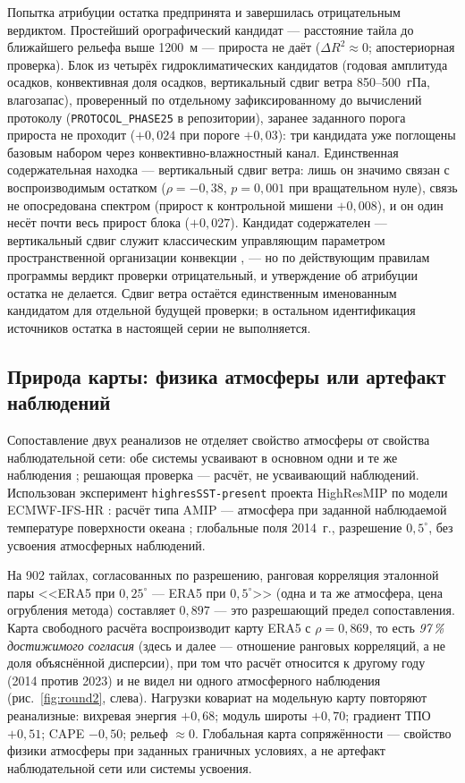 \documentclass[11pt,a4paper]{article}
\begin{document}
Попытка атрибуции остатка предпринята и завершилась отрицательным вердиктом. Простейший орографический кандидат --- расстояние тайла до ближайшего рельефа выше 1200~м --- прироста не даёт ($\Delta R^2\approx0$; апостериорная проверка). Блок из четырёх гидроклиматических кандидатов (годовая амплитуда осадков, конвективная доля осадков, вертикальный сдвиг ветра 850--500~гПа, влагозапас), проверенный по отдельному зафиксированному до вычислений протоколу (\texttt{PROTOCOL\_PHASE25} в репозитории), заранее заданного порога прироста не проходит ($+0{,}024$ при пороге $+0{,}03$): три кандидата уже поглощены базовым набором через конвективно-влажностный канал. Единственная содержательная находка --- вертикальный сдвиг ветра: лишь он значимо связан с воспроизводимым остатком ($\rho=-0{,}38$, $p=0{,}001$ при вращательном нуле), связь не опосредована спектром (прирост к контрольной мишени $+0{,}008$), и он один несёт почти весь прирост блока ($+0{,}027$). Кандидат содержателен --- вертикальный сдвиг служит классическим управляющим параметром пространственной организации конвекции \cite{RotunnoKlempWeisman1988,Wing2017}, --- но по действующим правилам программы вердикт проверки отрицательный, и утверждение об атрибуции остатка не делается. Сдвиг ветра остаётся единственным именованным кандидатом для отдельной будущей проверки; в остальном идентификация источников остатка в настоящей серии не выполняется.

\subsection{Природа карты: физика атмосферы или артефакт наблюдений}
\label{sec:model}

Сопоставление двух реанализов не отделяет свойство атмосферы от свойства наблюдательной сети: обе системы усваивают в основном одни и те же наблюдения \cite{Hersbach2020,Gelaro2017}; решающая проверка --- расчёт, не усваивающий наблюдений. Использован эксперимент \texttt{highresSST-present} проекта HighResMIP \cite{Haarsma2016} по модели ECMWF-IFS-HR \cite{Roberts2018}: расчёт типа AMIP --- атмосфера при заданной наблюдаемой температуре поверхности океана \cite{Gates1992}; глобальные поля 2014~г., разрешение $0{,}5^\circ$, без усвоения атмосферных наблюдений.

На 902 тайлах, согласованных по разрешению, ранговая корреляция эталонной пары <<ERA5 при $0{,}25^\circ$ --- ERA5 при $0{,}5^\circ$>> (одна и та же атмосфера, цена огрубления метода) составляет $0{,}897$ --- это разрешающий предел сопоставления. Карта свободного расчёта воспроизводит карту ERA5 с $\rho=0{,}869$, то есть \emph{97\,\% достижимого согласия} (здесь и далее --- отношение ранговых корреляций, а не доля объяснённой дисперсии), при том что расчёт относится к другому году (2014 против 2023) и не видел ни одного атмосферного наблюдения (рис.~\ref{fig:round2}, слева). Нагрузки ковариат на модельную карту повторяют реанализные: вихревая энергия $+0{,}68$; модуль широты $+0{,}70$; градиент ТПО $+0{,}51$; CAPE $-0{,}50$; рельеф $\approx0$. Глобальная карта сопряжённости --- свойство физики атмосферы при заданных граничных условиях, а не артефакт наблюдательной сети или системы усвоения.
\end{document}
